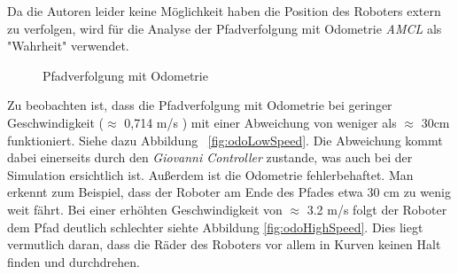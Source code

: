 \documentclass[11pt,a4paper]{article}
\begin{document}
{Da die Autoren leider keine M\"oglichkeit haben die Position des Roboters extern zu verfolgen, wird f\"ur die Analyse der Pfadverfolgung mit Odometrie \textit{AMCL} als "Wahrheit" verwendet.
\newpage
\begin{figure}
	\centering
	\caption{Pfadverfolgung mit Odometrie}
\end{figure}

Zu beobachten ist, dass die Pfadverfolgung mit Odometrie bei geringer Geschwindigkeit ($\approx$ 0,714 m/s ) mit einer Abweichung von weniger als $\approx$ 30cm funktioniert. Siehe dazu Abbildung ~\ref{fig:odoLowSpeed}. Die Abweichung kommt dabei einerseits durch den \textit{Giovanni Controller} zustande, was auch bei der Simulation ersichtlich ist. Außerdem ist die Odometrie fehlerbehaftet. Man erkennt zum Beispiel, dass der Roboter am Ende des Pfades etwa 30 cm zu wenig weit f\"ahrt.
Bei einer erh\"ohten Geschwindigkeit von $\approx$ 3.2 m/s folgt der Roboter dem Pfad deutlich schlechter siehte Abbildung \ref{fig:odoHighSpeed}. Dies liegt vermutlich daran, dass die R\"ader des Roboters vor allem in Kurven keinen Halt finden und durchdrehen.   

\newpage  

}
\end{document}
